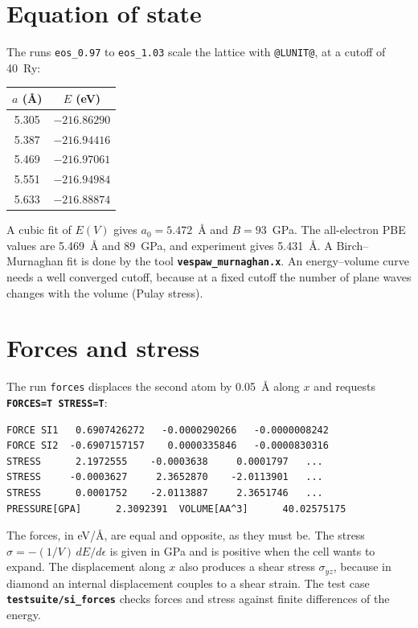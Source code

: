 \documentclass[11pt,a4paper,oneside]{book}
\newcommand{\key}[1]{\textbf{\texttt{#1}}}
\newcommand{\file}[1]{\textbf{\texttt{#1}}}
\begin{document}
\section{Equation of state}

The runs \texttt{eos\_0.97} to \texttt{eos\_1.03} scale the lattice
with \texttt{@LUNIT@}, at a cutoff of 40~Ry:
\begin{center}
\begin{tabular}{cc}\toprule
$a$ (\AA) & $E$ (eV) \\ \midrule
5.305 & $-216.86290$ \\
5.387 & $-216.94416$ \\
5.469 & $-216.97061$ \\
5.551 & $-216.94984$ \\
5.633 & $-216.88874$ \\ \bottomrule
\end{tabular}
\end{center}
A cubic fit of $E(V)$ gives $a_0=5.472$~\AA{} and $B=93$~GPa. The
all-electron PBE values are 5.469~\AA{} and 89~GPa, and experiment gives
5.431~\AA. A Birch--Murnaghan fit is done by the tool
\file{vespaw\_murnaghan.x}. An energy--volume curve needs a well
converged cutoff, because at a fixed cutoff the number of plane waves
changes with the volume (Pulay stress).

\section{Forces and stress}

The run \texttt{forces} displaces the second atom by 0.05~\AA{} along
$x$ and requests \key{FORCES=T STRESS=T}:
\begin{verbatim}
FORCE SI1   0.6907426272   -0.0000290266   -0.0000008242
FORCE SI2  -0.6907157157    0.0000335846   -0.0000830316
STRESS      2.1972555    -0.0003638     0.0001797   ...
STRESS     -0.0003627     2.3652870    -2.0113901   ...
STRESS      0.0001752    -2.0113887     2.3651746   ...
PRESSURE[GPA]      2.3092391  VOLUME[AA^3]      40.02575175
\end{verbatim}
The forces, in eV/\AA, are equal and opposite, as they must be. The
stress $\sigma=-(1/V)\,dE/d\epsilon$ is given in GPa and is positive
when the cell wants to expand. The displacement along $x$ also produces
a shear stress $\sigma_{yz}$, because in diamond an internal
displacement couples to a shear strain. The test case
\file{testsuite/si\_forces} checks forces and stress against finite
differences of the energy.
\end{document}
